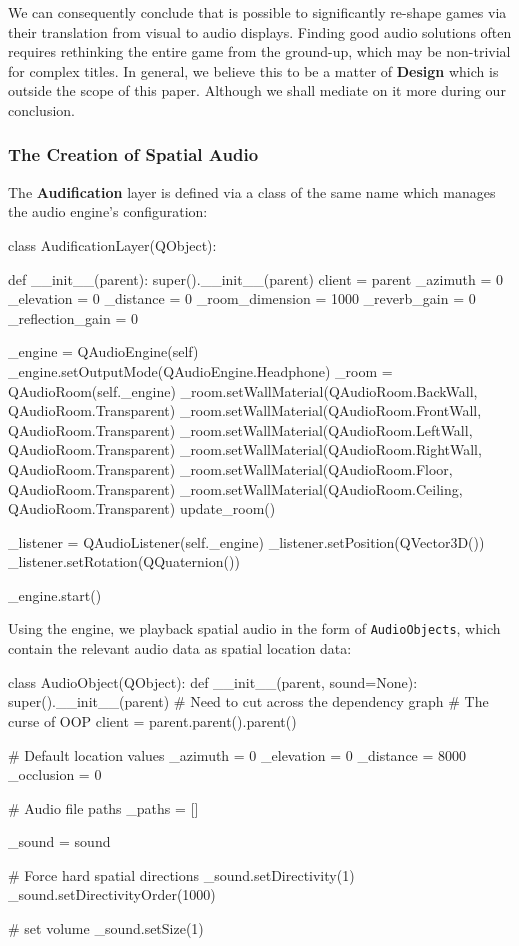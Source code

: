 \documentclass{report}
\newcommand{\design}{\textbf{Design}\xspace}
\newcommand{\audio}{\textbf{Audification}\xspace}
\begin{document}
We can consequently conclude that is possible to significantly re-shape games via their translation from visual to audio displays. Finding good audio solutions often requires rethinking the entire game from the ground-up, which may be non-trivial for complex titles. In general, we believe this to be a matter of \design which is outside the scope of this paper. Although we shall mediate on it more during our conclusion.

\subsubsection{The Creation of Spatial Audio}
The \audio layer is defined via a class of the same name which manages the audio engine's configuration:

\begin{codeblock}
class AudificationLayer(QObject):

    def __init__(parent):
        super().__init__(parent)
        client = parent
        _azimuth = 0
        _elevation = 0
        _distance = 0
        _room_dimension = 1000
        _reverb_gain = 0
        _reflection_gain = 0

        _engine = QAudioEngine(self)
        _engine.setOutputMode(QAudioEngine.Headphone)
        _room = QAudioRoom(self._engine)
        _room.setWallMaterial(QAudioRoom.BackWall, QAudioRoom.Transparent)
        _room.setWallMaterial(QAudioRoom.FrontWall, QAudioRoom.Transparent)
        _room.setWallMaterial(QAudioRoom.LeftWall, QAudioRoom.Transparent)
        _room.setWallMaterial(QAudioRoom.RightWall, QAudioRoom.Transparent)
        _room.setWallMaterial(QAudioRoom.Floor, QAudioRoom.Transparent)
        _room.setWallMaterial(QAudioRoom.Ceiling, QAudioRoom.Transparent)
        update_room()

        _listener = QAudioListener(self._engine)
        _listener.setPosition(QVector3D())
        _listener.setRotation(QQuaternion())

        _engine.start()

\end{codeblock}

Using the engine, we playback spatial audio in the form of \texttt{AudioObjects}, which contain the relevant audio data as spatial location data:

\begin{codeblock}
class AudioObject(QObject):
    def __init__(parent, sound=None):
        super().__init__(parent)
        # Need to cut across the dependency graph
        # The curse of OOP
        client = parent.parent().parent()

        # Default location values
        _azimuth = 0
        _elevation = 0
        _distance = 8000
        _occlusion = 0

        # Audio file paths
        _paths = []
        
        _sound = sound
        
        # Force hard spatial directions
        _sound.setDirectivity(1)
        _sound.setDirectivityOrder(1000)
        
        # set volume
        _sound.setSize(1)
\end{codeblock}
\end{document}
